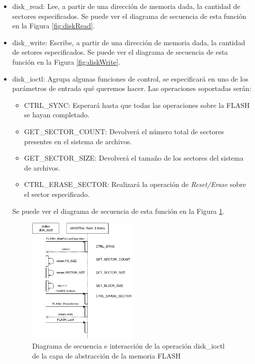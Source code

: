 \begin{itemize}
\item disk\_read: Lee, a partir de una dirección de memoria dada, la cantidad de sectores especificados. Se puede ver el diagrama de secuencia de esta función en la Figura \ref{fig:diskRead}.\\

\item disk\_write: Escribe, a partir de una dirección de memoria dada, la cantidad de setores especificados. Se puede ver el diagrama de secuencia de esta función en la Figura \ref{fig:diskWrite}.\\

\item disk\_ioctl: Agrupa algunas funciones de control, se especificará en uno de los parámetros de entrada qué queremos hacer. Las operaciones soportadas serán: 
\begin{itemize}

\item CTRL\_SYNC: Esperará hasta que todas las operaciones sobre la FLASH se hayan completado.
\item GET\_SECTOR\_COUNT: Devolverá el número total de sectores presentes en el sistema de archivos.
\item GET\_SECTOR\_SIZE: Devolverá el tamaño de los sectores del sistema de archivos.
\item CTRL\_ERASE\_SECTOR: Realizará la operación de \textit{Reset/Erase} sobre el sector especificado.\\
\end{itemize} 
Se puede ver el diagrama de secuencia de esta función en la Figura \ref{fig:diskioctl}.\\

\begin{figure}[!h]
\begin{center}
\includegraphics[width=0.5\textwidth]{figs/diskioctl.png}
\caption{Diagrama de secuencia e interacción de la operación disk\_ioctl de la capa de abstracción de la memoria FLASH}
\label{fig:diskioctl}
\end{center}
\end{figure}

\end{itemize}


